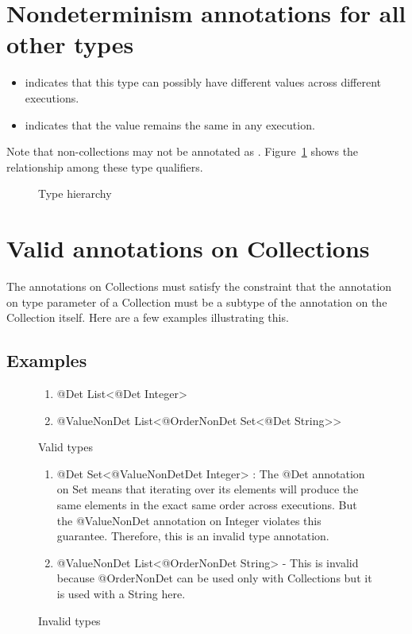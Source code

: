 \section{Nondeterminism annotations for all other types\label{nondeterminism-annotations-elements}}

\begin{itemize}
\item
   indicates
  that this type can possibly have different values across different executions.
 \item
   indicates that
  the value remains the same in any execution.
\end{itemize}

Note that non-collections may not be annotated as .
Figure~\ref{fig-hierarchy} shows the relationship among these
type qualifiers.

\begin{figure}[h]\caption{Type hierarchy}
	\begin{center}
	\end{center}
	\label{fig-hierarchy}
\end{figure}

\section{Valid annotations on Collections\label{type-validity}}
The annotations on Collections must satisfy the constraint that the annotation on type parameter of a Collection must be a
subtype of the annotation on the Collection itself. Here are a few examples illustrating this.

\subsection{Examples\label{validity-examples}}
\begin{figure}[h]\caption{Valid types}
	\begin{enumerate}
		\item @Det List<@Det Integer>
		\item @ValueNonDet List<@OrderNonDet Set<@Det String>>
	\end{enumerate}
\end{figure}

\begin{figure}[h]\caption{Invalid types}
	\begin{enumerate}
		\item @Det Set<@ValueNonDetDet Integer> : The @Det annotation on Set means that iterating over its elements will produce the same
		elements in the exact same order across executions. But the @ValueNonDet annotation on Integer violates this guarantee. Therefore, this is an invalid type annotation.
		\item @ValueNonDet List<@OrderNonDet String> - This is invalid because @OrderNonDet can be used only with Collections but it is used with a String here.
	\end{enumerate}
\end{figure}

